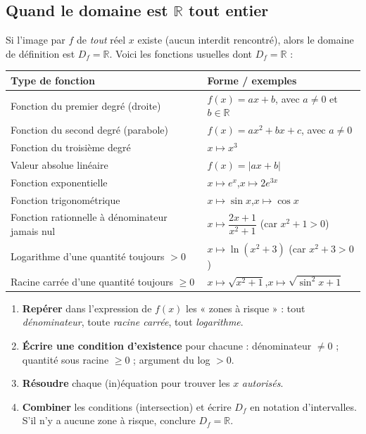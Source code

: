 \documentclass[11pt,a4paper]{article}
\newcommand{\R}{\mathbb{R}}
\newcommand{\Df}{D_f}
\begin{document}
\subsection{Quand le domaine est $\R$ tout entier}

Si l'image par $f$ de \emph{tout} réel $x$ existe (aucun interdit rencontré), alors le
domaine de définition est $\Df=\R$. Voici les fonctions usuelles dont $\Df=\R$ :

\begin{center}
\renewcommand{\arraystretch}{1.35}
\begin{tabular}{>{\raggedright\arraybackslash}p{6.4cm} >{\raggedright\arraybackslash}p{9.0cm}}
\toprule
\rowcolor{primarylight}
\textbf{Type de fonction} & \textbf{Forme / exemples} \\
\midrule
Fonction du premier degré (droite) & $f(x)=ax+b$, avec $a\neq 0$ et $b\in\R$ \\
Fonction du second degré (parabole) & $f(x)=ax^2+bx+c$, avec $a\neq 0$ \\
Fonction du troisième degré & $x\mapsto x^3$ \\
Valeur absolue linéaire & $f(x)=\lvert ax+b\rvert$ \\
Fonction exponentielle & $x\mapsto e^{x}$,\quad $x\mapsto 2e^{3x}$ \\
Fonction trigonométrique & $x\mapsto \sin x$,\quad $x\mapsto \cos x$ \\
Fonction rationnelle à dénominateur jamais nul & $x\mapsto \dfrac{2x+1}{x^2+1}$ \quad(car $x^2+1>0$) \\
Logarithme d'une quantité toujours $>0$ & $x\mapsto \ln(x^2+3)$ \quad(car $x^2+3>0$) \\
Racine carrée d'une quantité toujours $\geq 0$ & $x\mapsto \sqrt{x^2+1}$,\quad $x\mapsto\sqrt{\sin^2 x+1}$ \\
\bottomrule
\end{tabular}
\end{center}

\begin{methode}
\begin{enumerate}[leftmargin=1.8em,topsep=2pt,itemsep=2pt]
  \item \textbf{Repérer} dans l'expression de $f(x)$ les « zones à risque » :
        tout \emph{dénominateur}, toute \emph{racine carrée}, tout \emph{logarithme}.
  \item \textbf{Écrire une condition d'existence} pour chacune :
        dénominateur $\neq 0$ ; quantité sous racine $\geq 0$ ; argument du log $>0$.
  \item \textbf{Résoudre} chaque (in)équation pour trouver les $x$ \emph{autorisés}.
  \item \textbf{Combiner} les conditions (intersection) et écrire $\Df$ en notation d'intervalles.
        S'il n'y a aucune zone à risque, conclure $\Df=\R$.
\end{enumerate}
\end{methode}
\end{document}
